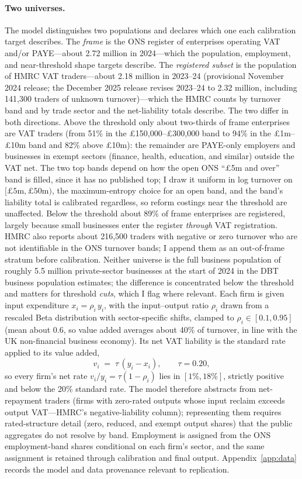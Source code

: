 \paragraph{Two universes.} The model distinguishes two populations and
declares which one each calibration target describes. The \emph{frame} is the
ONS register of enterprises operating VAT and/or PAYE---about 2.72 million in
2024---which the population, employment, and near-threshold shape targets
describe. The \emph{registered subset} is the population of HMRC VAT
traders---about 2.18 million in 2023--24 (provisional November 2024 release;
the December 2025 release revises 2023--24 to 2.32 million, including
141{,}300 traders of unknown turnover)---which the HMRC counts by turnover
band and by trade sector and the net-liability totals describe. The two differ
in both directions. Above the threshold only about two-thirds of frame
enterprises are VAT traders (from 51\% in the \pounds150{,}000--\pounds300{,}000
band to 94\% in the \pounds1m--\pounds10m band and 82\% above \pounds10m):
the remainder are PAYE-only employers and businesses in exempt sectors
(finance, health, education, and similar) outside the VAT net. The two top
bands depend on how the open ONS ``\pounds5m and over'' band is filled, since
it has no published top; I draw it uniform in log turnover on
$[\pounds5\text{m},\pounds50\text{m})$, the maximum-entropy choice for an
open band, and the band's liability total is calibrated regardless, so reform
costings near the threshold are unaffected. Below the threshold about 89\% of frame
enterprises are registered, largely because small businesses enter the
register \emph{through} VAT registration. HMRC also reports about 216{,}500
traders with negative or zero turnover who are not identifiable in the ONS
turnover bands; I append them as an out-of-frame stratum before calibration.
Neither universe is the full business population of roughly 5.5 million
private-sector businesses at the start of 2024 in the DBT business population
estimates; the difference is concentrated below the
threshold and matters for threshold \emph{cuts}, which I flag where relevant.
Each firm is given input expenditure $x_i = \rho_i\,y_i$,
with the input--output ratio $\rho_i$ drawn from a rescaled Beta distribution
with sector-specific shifts, clamped to $\rho_i \in [0.1, 0.95]$ (mean about
0.6, so value added averages about 40\% of turnover, in line with the UK
non-financial business economy). Its net VAT liability is the standard rate
applied to its value added,
\[
  v_i \;=\; \tau\,(y_i - x_i), \qquad \tau = 0.20,
\]
so every firm's net rate $v_i/y_i = \tau(1-\rho_i)$ lies in $[1\%, 18\%]$,
strictly positive and below the 20\% standard rate. The model therefore
abstracts from net-repayment traders (firms with zero-rated outputs whose input
reclaim exceeds output VAT---HMRC's negative-liability column); representing
them requires rated-structure detail (zero, reduced, and exempt output shares)
that the public aggregates do not resolve by band. Employment is assigned from
the ONS employment-band shares conditional on each firm's sector, and the same
assignment is retained through calibration and final output. Appendix~\ref{app:data}
records the model and data provenance relevant to replication.

